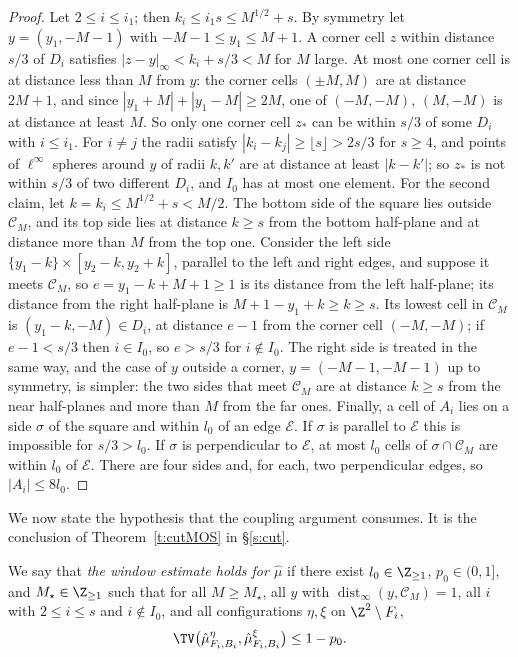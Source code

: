 \begin{proof}
Let $2 \le i \le i_1$; then $k_i \le i_1 s \le M^{1/2} + s$. By symmetry let $y = (y_1, -M - 1)$ with $-M - 1 \le y_1 \le M + 1$. A corner cell $z$ within distance $s/3$ of $D_i$ satisfies $|z - y|_\infty < k_i + s/3 < M$ for $M$ large. At most one corner cell is at distance less than $M$ from $y$: the corner cells $(\pm M, M)$ are at distance $2M + 1$, and since $|y_1 + M| + |y_1 - M| \ge 2M$, one of $(-M, -M)$, $(M, -M)$ is at distance at least $M$. So only one corner cell $z_*$ can be within $s/3$ of some $D_i$ with $i \le i_1$. For $i \neq j$ the radii satisfy $|k_i - k_j| \ge \lfloor s \rfloor > 2s/3$ for $s \ge 4$, and points of $\ell^\infty$ spheres around $y$ of radii $k, k'$ are at distance at least $|k - k'|$; so $z_*$ is not within $s/3$ of two different $D_i$, and $I_0$ has at most one element. For the second claim, let $k = k_i \le M^{1/2} + s < M/2$. The bottom side of the square lies outside $\mathcal C_M$, and its top side lies at distance $k \ge s$ from the bottom half-plane and at distance more than $M$ from the top one. Consider the left side $\{y_1 - k\} \times [y_2 - k, y_2 + k]$, parallel to the left and right edges, and suppose it meets $\mathcal C_M$, so $e = y_1 - k + M + 1 \ge 1$ is its distance from the left half-plane; its distance from the right half-plane is $M + 1 - y_1 + k \ge k \ge s$. Its lowest cell in $\mathcal C_M$ is $(y_1 - k, -M) \in D_i$, at distance $e - 1$ from the corner cell $(-M, -M)$; if $e - 1 < s/3$ then $i \in I_0$, so $e > s/3$ for $i \notin I_0$. The right side is treated in the same way, and the case of $y$ outside a corner, $y = (-M - 1, -M - 1)$ up to symmetry, is simpler: the two sides that meet $\mathcal C_M$ are at distance $k \ge s$ from the near half-planes and more than $M$ from the far ones. Finally, a cell of $A_i$ lies on a side $\sigma$ of the square and within $l_0$ of an edge $\mathcal E$. If $\sigma$ is parallel to $\mathcal E$ this is impossible for $s/3 > l_0$. If $\sigma$ is perpendicular to $\mathcal E$, at most $l_0$ cells of $\sigma \cap \mathcal C_M$ are within $l_0$ of $\mathcal E$. There are four sides and, for each, two perpendicular edges, so $|A_i| \le 8 l_0$.
\end{proof}

We now state the hypothesis that the coupling argument consumes. It is the conclusion of Theorem~\ref{t:cutMOS} in \S\ref{s:cut}.

\begin{definition}\label{d:W}
We say that \emph{the window estimate holds for $\hat\mu$} if there exist $l_0 \in \Z_{\ge1}$, $p_0 \in (0, 1]$, and $M_\star\in\Z_{\ge1}$ such that for all $M \ge M_\star$, all $y$ with $\operatorname{dist}_\infty(y, \mathcal C_M) = 1$, all $i$ with $2 \le i \le s$ and $i \notin I_0$, and all configurations $\eta, \xi$ on $\Z^2 \setminus F_i$,
\begin{equation}\label{e:W}
\TV\bigl( \hat\mu^\eta_{F_i, B_i}, \hat\mu^\xi_{F_i, B_i} \bigr) \le 1 - p_0 .
\end{equation}
\end{definition}

